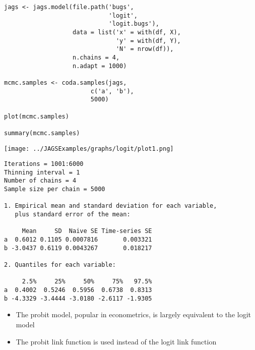 \documentclass{beamer}
\begin{document}
\begin{frame}[fragile]
  \begin{verbatim}
jags <- jags.model(file.path('bugs',
                             'logit',
                             'logit.bugs'),
                   data = list('x' = with(df, X),
                               'y' = with(df, Y),
                               'N' = nrow(df)),
                   n.chains = 4,
                   n.adapt = 1000)
 
mcmc.samples <- coda.samples(jags,
                        c('a', 'b'),
                        5000)

plot(mcmc.samples)

summary(mcmc.samples)
  \end{verbatim}
\end{frame}

\begin{frame}[fragile]
  \begin{center}
    \texttt{[image: ../JAGSExamples/graphs/logit/plot1.png]}
  \end{center}
\end{frame}

\begin{frame}[fragile]
  \begin{verbatim}
Iterations = 1001:6000
Thinning interval = 1 
Number of chains = 4 
Sample size per chain = 5000 

1. Empirical mean and standard deviation for each variable,
   plus standard error of the mean:

     Mean     SD  Naive SE Time-series SE
a  0.6012 0.1105 0.0007816       0.003321
b -3.0437 0.6119 0.0043267       0.018217

2. Quantiles for each variable:

     2.5%     25%     50%     75%   97.5%
a  0.4002  0.5246  0.5956  0.6738  0.8313
b -4.3329 -3.4444 -3.0180 -2.6117 -1.9305
  \end{verbatim}
\end{frame}

\begin{frame}
  \begin{itemize}
    \item{The probit model, popular in econometrics, is largely equivalent to the logit model}
    \item{The probit link function is used instead of the logit link function}
  \end{itemize}
\end{frame}
\end{document}
